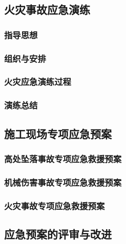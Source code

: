 \subsection{火灾事故应急演练}
\subsubsection{指导思想}

\subsubsection{组织与安排}

\subsubsection{火灾应急演练过程}

\subsubsection{演练总结}

\subsection{施工现场专项应急预案}
\subsubsection{高处坠落事故专项应急救援预案}

\subsubsection{机械伤害事故专项应急救援预案}

\subsubsection{火灾事故专项应急救援预案}

\subsection{应急预案的评审与改进}
